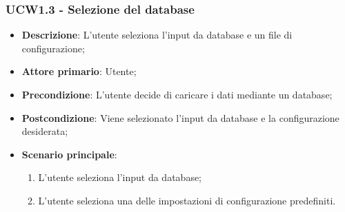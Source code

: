 \subsubsection{UCW1.3 - Selezione del database}
\label{ssub:ucw1.3}
\begin{itemize}
    \item \textbf{Descrizione}: L'utente seleziona l'input da database e un file di configurazione;
	
    \item \textbf{Attore primario}: Utente;
    
    \item \textbf{Precondizione}:   L'utente decide di caricare i dati mediante un database;
    \item \textbf{Postcondizione}:  Viene selezionato l'input da database e la configurazione desiderata;

	\item \textbf{Scenario principale}:
		\begin{enumerate}
			\item L'utente seleziona l'input da database;
			\item L'utente seleziona una delle impostazioni di configurazione predefiniti.
        \end{enumerate}

\end{itemize}
